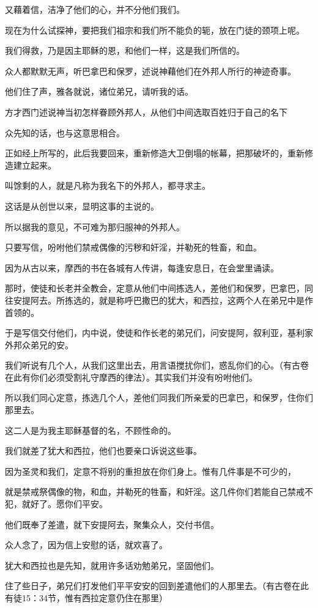 \documentclass[12pt,oneside]{book}
\begin{document}
又藉着信，洁净了他们的心，并不分他们我们。

现在为什么试探神，要把我们祖宗和我们所不能负的轭，放在门徒的颈项上呢。

我们得救，乃是因主耶稣的恩，和他们一样，这是我们所信的。

众人都默默无声，听巴拿巴和保罗，述说神藉他们在外邦人所行的神迹奇事。

他们住了声，雅各就说，诸位弟兄，请听我的话。

方才西门述说神当初怎样眷顾外邦人，从他们中间选取百姓归于自己的名下

众先知的话，也与这意思相合。

正如经上所写的，此后我要回来，重新修造大卫倒塌的帐幕，把那破坏的，重新修造建立起来。

叫馀剩的人，就是凡称为我名下的外邦人，都寻求主。

这话是从创世以来，显明这事的主说的。

所以据我的意见，不可难为那归服神的外邦人。

只要写信，吩咐他们禁戒偶像的污秽和奸淫，并勒死的牲畜，和血。

因为从古以来，摩西的书在各城有人传讲，每逢安息日，在会堂里诵读。

那时，使徒和长老并全教会，定意从他们中间拣选人，差他们和保罗，巴拿巴，同往安提阿去。所拣选的，就是称呼巴撒巴的犹大，和西拉，这两个人在弟兄中是作首领的。

于是写信交付他们，内中说，使徒和作长老的弟兄们，问安提阿，叙利亚，基利家外邦众弟兄的安。

我们听说有几个人，从我们这里出去，用言语搅扰你们，惑乱你们的心。（有古卷在此有你们必须受割礼守摩西的律法）。其实我们并没有吩咐他们。

所以我们同心定意，拣选几个人，差他们同我们所亲爱的巴拿巴，和保罗，住你们那里去。

这二人是为我主耶稣基督的名，不顾性命的。

我们就差了犹大和西拉，他们也要亲口诉说这些事。

因为圣灵和我们，定意不将别的重担放在你们身上。惟有几件事是不可少的，

就是禁戒祭偶像的物，和血，并勒死的牲畜，和奸淫。这几件你们若能自己禁戒不犯，就好了。愿你们平安。

他们既奉了差遣，就下安提阿去，聚集众人，交付书信。

众人念了，因为信上安慰的话，就欢喜了。

犹大和西拉也是先知，就用许多话劝勉弟兄，坚固他们。

住了些日子，弟兄们打发他们平平安安的回到差遣他们的人那里去。（有古卷在此有徒15：34节，惟有西拉定意仍住在那里）
\end{document}
